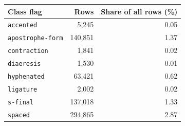 \begin{tabular}{lrr}
\toprule
Class flag & Rows & Share of all rows (\%) \\
\midrule
\texttt{accented} & 5,245 & 0.05 \\
\texttt{apostrophe-form} & 140,851 & 1.37 \\
\texttt{contraction} & 1,841 & 0.02 \\
\texttt{diaeresis} & 1,530 & 0.01 \\
\texttt{hyphenated} & 63,421 & 0.62 \\
\texttt{ligature} & 2,002 & 0.02 \\
\texttt{s-final} & 137,018 & 1.33 \\
\texttt{spaced} & 294,865 & 2.87 \\
\bottomrule
\end{tabular}
